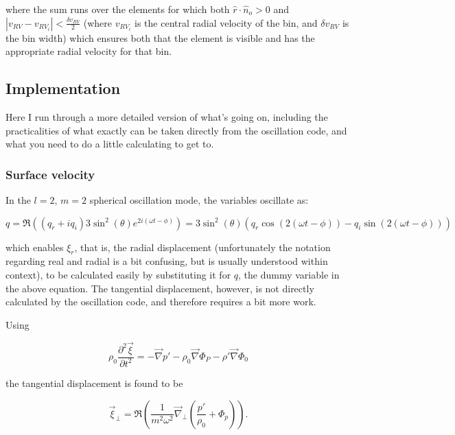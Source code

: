 \documentclass[11pt]{amsart}
\begin{document}
where the sum runs over the elements for which both $\hat{r} \cdot \hat{n}_{o} > 0$ and $| v_{RV} - v_{RV_{i}} | < \frac{\delta v_{RV}}{2}$ (where $v_{RV_{i}}$ is the central radial velocity of the bin, and $\delta v_{RV}$ is the bin width) which ensures both that the element is visible and has the appropriate radial velocity for that bin.



\subsection{Implementation} \label{RV:Implementation}

Here I run through a more detailed version of what's going on, including the practicalities of what exactly can be taken directly from the oscillation code, and what you need to do a little calculating to get to.

\subsubsection{Surface velocity} \label{RV:Implementation:SurfVel}

In the $l=2$, $m=2$ spherical oscillation mode, the variables oscillate as:

\begin{equation}
q = \Re \left(  \left( q_{r} + i q_{i} \right)  3 \sin^{2}(\theta) e^{2 i ( \omega t - \phi)}   \right)   =    3 \sin^{2}(\theta) \left(  q_{r} \cos \left( 2 ( \omega t - \phi) \right)  - q_{i} \sin \left( 2 ( \omega t - \phi) \right) \right) 
\end{equation}

which enables $\xi_{r}$, that is, the radial displacement (unfortunately the notation regarding real and radial is a bit confusing, but is usually understood within context), to be calculated easily by substituting it for $q$, the dummy variable in the above equation.  The tangential displacement, however, is not directly calculated by the oscillation code, and therefore requires a bit more work.

Using

\begin{equation} \label{eq:mom_lin}
\rho_{0} \frac{\partial^{2} \vec{\xi}}{\partial t^{2}} = - \vec{\nabla} p' - \rho_{0} \vec{\nabla} \Phi_{P}
- \rho' \vec{\nabla} \Phi_{0}
\end{equation}

the tangential displacement is found to be

\begin{equation}
\vec{\xi}_{\perp} = \Re \left(   \frac{1}{m^{2} \omega^{2}}  \vec{\nabla}_{\perp}  \left(   \frac{p'}{\rho_{0}}  +  \Phi_{p}   \right) \right).
\end{equation}
\end{document}

